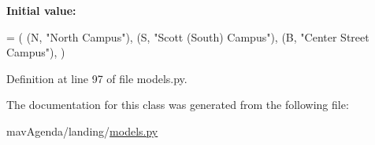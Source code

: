 {\bfseries Initial value\+:}
\begin{DoxyCode}
=  (
        (N, \textcolor{stringliteral}{"North Campus"}),
        (S, \textcolor{stringliteral}{"Scott (South) Campus"}),
        (B, \textcolor{stringliteral}{"Center Street Campus"}),
    )
\end{DoxyCode}


Definition at line 97 of file models.\+py.



The documentation for this class was generated from the following file\+:\begin{DoxyCompactItemize}
\item 
mav\+Agenda/landing/\mbox{\hyperlink{models_8py}{models.\+py}}\end{DoxyCompactItemize}
